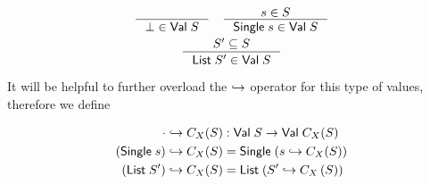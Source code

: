 \begin{gather*}
    \inference{}{\bot \in \mathsf{Val} \; S} \quad
    \inference{s \in S}{\mathsf{Single} \; s \in \mathsf{Val} \; S}\\
    \inference{S' \subseteq S}{\mathsf{List} \; S' \in \mathsf{Val} \; S}
\end{gather*}



It will be helpful to further overload the $\hookrightarrow$ operator for this type of values, therefore we define


\begin{align}
    \cdot \hookrightarrow C_X(S) &: \mathsf{Val} \; S \rightarrow \mathsf{Val} \; C_X(S) \\
    (\mathsf{Single} \; s) \hookrightarrow C_X(S) &= \mathsf{Single} \; (s \hookrightarrow C_X(S)) \\
    (\mathsf{List} \; S') \hookrightarrow C_X(S) &= \mathsf{List} \; (S' \hookrightarrow C_X\left(S\right))
\end{align}


